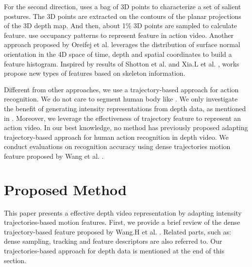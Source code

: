 \documentclass[review]{elsarticle}
\begin{document}
For the second direction, \cite{li2010action} uses a bag of 3D points to characterize a set of salient postures. The 3D points are extracted on the contours of the planar projections of the 3D depth map. And then, about 1\% 3D points are sampled to calculate feature. \cite{vieira2012stop, wang2012robust, wang2012mining} use occupancy patterns to represent feature in action video. Another approach proposed by Oreifej et al. \cite{oreifej2013hon4d} leverages the distribution of surface normal orientation in the 4D space of time, depth and spatial coordinates to build a feature histogram. Inspired by results of Shotton et al. \cite{shotton2013real} and Xia.L et al. \cite{xia2011human}, works \cite{yang2012eigenjoints, wang2012mining} propose new types of features based on skeleton information.

Different from other approaches, we use a trajectory-based approach for action recognition. We do not care to segment human body like \cite{li2010action,yang2012recognizing}. We only investigate the benefit of generating intensity representations from depth data, as mentioned in \cite{li2010action,yang2012recognizing}. Moreover, we leverage the effectiveness of trajectory feature to represent an action video. In our best knowledge, no method has previously proposed adapting trajectory-based approach for human action recognition in depth video. We conduct evaluations on recognition accuracy using dense trajectories motion feature proposed by Wang et al. \cite{wang2011densetraj}.

\section{Proposed Method}
\label{lbl:ProposedMethod}

This paper presents a effective depth video representation by adapting intensity trajectories-based motion features. First, we provide a brief review of the dense trajectory-based feature proposed by Wang.H et al. \cite{wang2011densetraj}. Related parts, such as: dense sampling, tracking and feature descriptors are also referred to. Our trajectories-based approach for depth data is mentioned at the end of this section.
\end{document}
